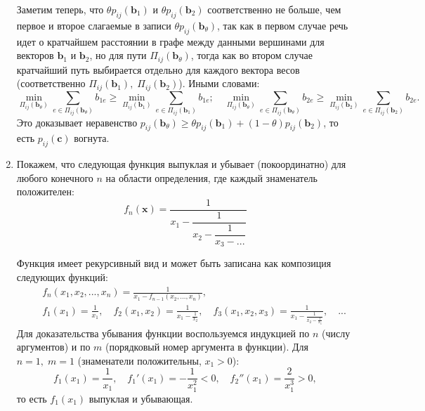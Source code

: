 \documentclass[a4paper,12pt]{article}
\begin{document}
\begin{enumerate}
\begin{equation*}
 		\end{equation*}
		Заметим теперь, что $\theta p_{ij}(\mathbf{b}_1)$ и $\theta p_{ij}(\mathbf{b}_2)$ соответственно не больше, чем первое и второе слагаемые в записи $\theta p_{ij}(\mathbf{b}_\theta)$, так как в первом случае речь идет о кратчайшем расстоянии в графе между данными вершинами для векторов $\mathbf{b}_1$ и $\mathbf{b}_2$, но для пути $\Pi_{ij}(\mathbf{b}_\theta)$, тогда как во втором случае кратчайший путь выбирается отдельно для каждого вектора весов (соответственно $\Pi_{ij}(\mathbf{b}_1),\;\Pi_{ij}(\mathbf{b}_2)$). Иными словами:
		\begin{equation*}
			\min_{\Pi_{ij}(\mathbf{b}_\theta)}\sum_{e\in \Pi_{ij}(\mathbf{b}_{\theta})} b_{1 e} \geqslant \min_{\Pi_{ij}(\mathbf{b}_1)}\sum_{e\in \Pi_{ij}(\mathbf{b}_1)} b_{1e};\quad 
			\min_{\Pi_{ij}(\mathbf{b}_\theta)}\sum_{e\in \Pi_{ij}(\mathbf{b}_{\theta})} b_{2 e} \geqslant \min_{\Pi_{ij}(\mathbf{b}_2)}\sum_{e\in \Pi_{ij}(\mathbf{b}_2)} b_{2e}.
		\end{equation*}
		Это доказывает неравенство $	p_{ij}(\mathbf{b}_\theta) \geqslant \theta p_{ij}(\mathbf{b}_1) + (1-\theta) p_{ij}(\mathbf{b}_2)$, то есть $p_{ij}(\mathbf{c})$ вогнута.
		
		\item 
		Покажем, что следующая функция выпуклая и убывает (покоординатно) для любого конечного $n$ на области определения, где каждый знаменатель положителен:
		\begin{equation*}
			f_n(\mathbf{x}) = \dfrac{1}{x_1 - \dfrac{1}{x_2 - \dfrac{1}{x_3 - ...}}}
		\end{equation*}
		
		Функция имеет рекурсивный вид и может быть записана как композиция следующих функций:
		\begin{equation*}\begin{aligned}
			&f_{n}(x_1,x_2,...,x_{n}) = \frac{1}{x_1 - f_{n-1}(x_2,...,x_{n})},\\\quad &f_1(x_1) = \frac{1}{x_1},\quad f_2(x_1, x_2) = \frac{1}{x_1-\frac{1}{x_2}},\quad f_3(x_1, x_2, x_3) = \frac{1}{x_1-\frac{1}{x_2 - \frac{1}{x_3}}},\quad...
		\end{aligned}\end{equation*}
		Для доказательства убывания функции воспользуемся индукцией по $n$ (числу аргументов) и по $m$ (порядковый номер аргумента в функции). Для $n=1,\;m=1$ (знаменатели положительны, $x_1>0$):
		\begin{equation*}
			f_1(x_1) = \frac{1}{x_1},\quad f_1'(x_1) = -\frac{1}{x_1^2} < 0,\quad f_2''(x_1) = \frac{2}{x_1^3} > 0,
		\end{equation*}
		то есть $f_1(x_1)$ выпуклая и убывающая.
		

\end{enumerate}
\end{document}

